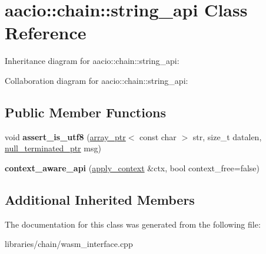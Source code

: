 \hypertarget{classaacio_1_1chain_1_1string__api}{}\section{aacio\+:\+:chain\+:\+:string\+\_\+api Class Reference}
\label{classaacio_1_1chain_1_1string__api}


Inheritance diagram for aacio\+:\+:chain\+:\+:string\+\_\+api\+:


Collaboration diagram for aacio\+:\+:chain\+:\+:string\+\_\+api\+:
\subsection*{Public Member Functions}
\begin{DoxyCompactItemize}
\item 
\mbox{\label{classaacio_1_1chain_1_1string__api_ad843c55ea01b26be3627d6cca297a63c}} 
void {\bfseries assert\+\_\+is\+\_\+utf8} (\mbox{\hyperlink{structaacio_1_1chain_1_1array__ptr}{array\+\_\+ptr}}$<$ const char $>$ str, size\+\_\+t datalen, \mbox{\hyperlink{structaacio_1_1chain_1_1null__terminated__ptr}{null\+\_\+terminated\+\_\+ptr}} msg)
\item 
\mbox{\label{classaacio_1_1chain_1_1string__api_ad2711b0a72fe3f1b0b1512c97e16d285}} 
{\bfseries context\+\_\+aware\+\_\+api} (\mbox{\hyperlink{classaacio_1_1chain_1_1apply__context}{apply\+\_\+context}} \&ctx, bool context\+\_\+free=false)
\end{DoxyCompactItemize}
\subsection*{Additional Inherited Members}


The documentation for this class was generated from the following file\+:\begin{DoxyCompactItemize}
\item 
libraries/chain/wasm\+\_\+interface.\+cpp\end{DoxyCompactItemize}
